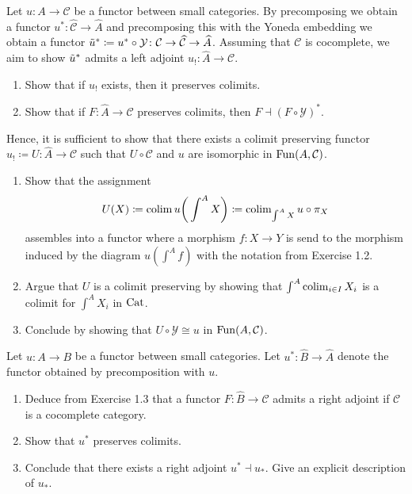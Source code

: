 \begin{Exercise}
	Let $ u \colon A \to \mathcal{ C } $ be a functor between small categories. By precomposing we obtain a functor $ u^* \colon \widehat{ \mathcal{ C } } \to \widehat{ A } $ and precomposing this with the Yoneda embedding we obtain a functor $ \Tilde{u}^* \coloneqq u^* \circ \mathcal{ Y } \colon \mathcal{ C } \to \widehat{ \mathcal{ C } } \to \widehat{ A } $.
	Assuming that $ \mathcal{ C } $ is cocomplete, we aim to show $ \Tilde{u}^* $ admits a left adjoint $ u_! \colon \widehat{ A } \to \mathcal{ C } $.
	\begin{enumerate}[label=(\alph*)]
		\item 
		Show that if $ u_! $ exists, then it preserves colimits.
		
		\item 
		Show that if $ F \colon \widehat{ A } \to \mathcal{ C } $ preserves colimits, then $ F \dashv ( F \circ \mathcal{ Y } )^*$.
	\end{enumerate}
	
	Hence, it is sufficient to show that there exists a colimit preserving functor $ u_! \coloneqq U \colon \widehat{ A } \to \mathcal{ C } $ such that $ U \circ \mathcal{ C } $ and $ u $ are isomorphic in $ \operatorname{Fun} ( A , \mathcal{ C } )$.
	
	\begin{enumerate}[resume, label=(\alph*)]
		\item 
		Show that the assignment
		\[
		U ( X ) \coloneqq \operatorname{colim} u \bigg( \int^A X \bigg) \coloneqq \operatorname{colim}_{ \int^A X } u \circ \pi_X
		\]
		assembles into a functor where a morphism $ f \colon X \to Y $ is send to the morphism induced by the diagram $ u ( \int^A f ) $ with the notation from Exercise 1.2.
		
		\item 
		Argue that $ U $ is a colimit preserving by showing that $ \int^A \operatorname{colim}_{ i \in I } X_i $ is a colimit for $ \int^A X_i $ in $ \operatorname{Cat} $.
		
		\item 
		Conclude by showing that $ U \circ \mathcal{ Y } \cong u $ in $ \operatorname{Fun} ( A , \mathcal{ C } )$.
	\end{enumerate}
\end{Exercise} 

\begin{Exercise}
	Let $ u \colon A \to B $ be a functor between small categories.
	Let $ u^* \colon \widehat{ B } \to \widehat{ A } $ denote the functor obtained by precomposition with $ u $. 
	\begin{enumerate}[label=(\alph*)]
		\item 
		Deduce from Exercise 1.3 that a functor $ F \colon \widehat{ B } \to \mathcal{ C } $ admits a right adjoint if $ \mathcal{ C } $ is a cocomplete category.
		
		\item 
		Show that $ u^* $ preserves colimits.
		
		\item 
		Conclude that there exists a right adjoint $ u^* \dashv u_* $. Give an explicit description of $ u_* $.
	\end{enumerate}
\end{Exercise}

